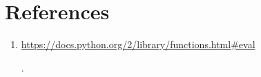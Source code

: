 \documentclass[11pt]{article}
\begin{document}
\section{References}
\begin{enumerate}
\item \hypertarget{pydoceval}{\url{https://docs.python.org/2/library/functions.html\#eval}}.
\end{enumerate}
\end{document}
